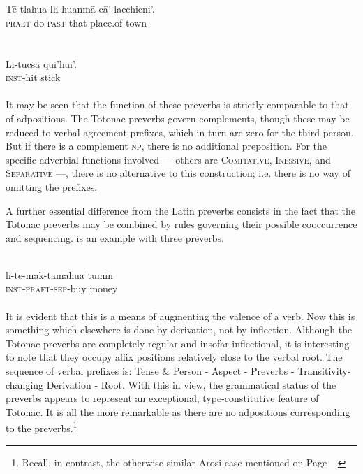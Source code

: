 \ea\label{ex:E81}
\langinfo{\LangToton}{}{}\\
 \ea {}\\
 \gll T\=e-tlahua-lh  huanm\=a  c\=a'-lacchicni'.\\
   \textsc{praet}-do-\textsc{past}  that  place.of-town\\
\\
\ex {}\\
\gll  L\=i-tucsa  qui'hui'.\\
 \textsc{inst}-hit  stick\\
\\
\z
\z
\noindent 
It may be seen that the function of these preverbs is strictly comparable to that of adpositions. The Totonac preverbs govern complements, though these may be reduced to verbal agreement prefixes, which in turn are zero for the third person. But if there is a complement \textsc{np}, there is no additional preposition. For the specific adverbial functions involved — others are \textsc{Comitative}, \textsc{Inessive}, and \textsc{Separative} —, there is no alternative to this construction; i.e. there is no way of omitting the prefixes.

A further essential difference from the Latin preverbs consists in the fact that the Totonac preverbs may be combined by rules governing their possible cooccurrence and sequencing.  is an example with three preverbs.

\ea\label{ex:E82}
 \\
\gll l\=i-t\=e-mak-tam\=ahua  tum\=in\\
\textsc{inst}-\textsc{praet}-\textsc{sep}-buy  money\\
\\
\z
\noindent It is evident that this is a means of augmenting the valence of a verb. Now this is something which elsewhere is done by derivation, not by inflection. Although the Totonac preverbs are completely regular and insofar inflectional, it is interesting to note that they occupy affix positions relatively close to the verbal root. The sequence of verbal prefixes is: Tense \& Person - Aspect - Preverbs - Transitivity-changing Derivation - Root. With this in view, the grammatical status of the preverbs appears to represent an exceptional, type-constitutive feature of Totonac. It is all the more remarkable as there are no adpositions corresponding to the preverbs.\footnote{Recall, in contrast, the otherwise similar Arosi case mentioned on Page~\pageref{page105}\chkfn%
.}

